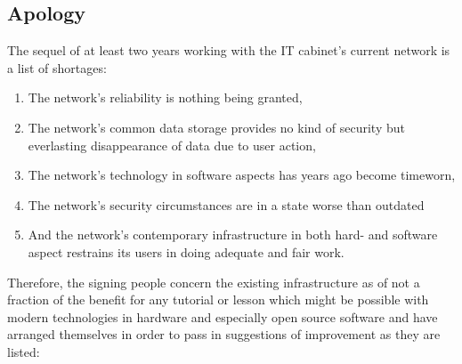 \subsection{Apology}
The sequel of at least two years working with the IT cabinet's current network is a list of shortages:
\begin{enumerate}
 \item The network's reliability is nothing being granted,
 \item The network's common data storage provides no kind of security but everlasting disappearance of data due to user action,
 \item The network's technology in software aspects has years ago become timeworn,
 \item The network's security circumstances are in a state worse than outdated
 \item And the network's contemporary infrastructure in both hard- and software aspect restrains its users in doing adequate and fair work.
\end{enumerate}
Therefore, the signing people concern the existing infrastructure as of not a fraction of the benefit for any tutorial or lesson which might be possible with modern technologies in hardware and especially open source software and have arranged themselves in order to pass in suggestions of improvement as they are listed:

